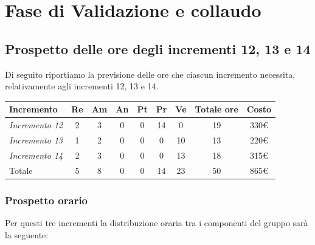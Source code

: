 {{{{{{{{{{{{{{{{{\section{Fase di Validazione e collaudo}\label{PreventivoFaseDiProgettazionediValidazioneECollaudo}

\subsection{Prospetto delle ore degli incrementi 12, 13 e 14}\label{PreventivoFaseDiProgettazionediValidazioneECollaudoIncrementi12-13-14}
Di seguito riportiamo la previsione delle ore che ciascun incremento necessita, relativamente agli incrementi 12, 13 e 14.
\quad
\def\tabularxcolumn#1{m{#1}}
{

	\begin{center}
		\renewcommand{\arraystretch}{1.4}
		\begin{tabularx}{\textwidth}{|X|c|c|c|c|c|c|c|c|}
			\hline
			\rowcolor{airforceblue}
			\textbf{Incremento} & \textbf{Re} & \textbf{Am} & \textbf{An} & \textbf{Pt} & \textbf{Pr} & \textbf{Ve} & \textbf{Totale ore} & \textbf{Costo}\\
			\hline
			\textit{Incremento 12} & 2 & 3 & 0 & 0 & 14 & 0 & 19 & 330€\\
			\hline
			\textit{Incremento 13} & 1 & 2 & 0 & 0 & 0 & 10 & 13 & 220€\\
			\hline
			\textit{Incremento 14} & 2 & 3 & 0 & 0 & 0 & 13 & 18 & 315€\\
			\hline
			Totale & 5 & 8 & 0 & 0 & 14 & 23 & 50 & 865€\\
			\hline
		\end{tabularx}
	\end{center}

\subsubsection{Prospetto orario}\label{PreventivoFaseDiProgettazionediValidazioneECollaudoIncrementi12-13-14ProspettoOrario}
Per questi tre incrementi la distribuzione oraria tra i componenti del gruppo sarà la seguente:

}}}}}}}}}}}}}}}}}}
